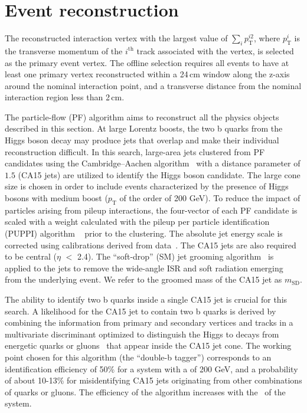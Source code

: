


\section{Event reconstruction}

The reconstructed interaction vertex with the largest value of $\sum_{i} p_\mathrm{T}^{i2}$, where $p_\mathrm{T}^{i}$ is the transverse momentum of the $i^\mathrm{th}$ track 
associated with the vertex, is selected as the primary event vertex. The offline selection requires all events to have at least one primary vertex reconstructed within a 24\,cm window along the z-axis around the nominal interaction point, and a transverse distance from the nominal interaction region less than 2\,cm.

The particle-flow (PF) \cite{Sirunyan:2017ulk} algorithm aims to reconstruct all the physics objects described in this section. At large Lorentz boosts, the two b quarks from the Higgs boson decay may produce jets that overlap and make their individual reconstruction difficult. In this search, large-area jets clustered from PF candidates using the Cambridge--Aachen algorithm~\cite{cajets} with a distance parameter of $1.5$ (CA15 jets) are utilized to identify the Higgs boson candidate.  The large cone size is chosen in order to include events characterized by the presence of Higgs bosons with medium boost ($p_\mathrm{T}$ of the order of 200 GeV).
To reduce the impact of particles arising from pileup interactions,  the four-vector of each PF candidate is scaled with a weight calculated with the pileup per particle identification (PUPPI) algorithm ~\cite{puppi} prior to the clustering.
The absolute jet energy scale is corrected using calibrations derived from data~\cite{jec}. The CA15 jets are also required to be central ($\eta$ $<$ 2.4).
The ``soft-drop'' (SM) jet grooming algorithm~\cite{msd} is applied to the jets to remove the wide-angle ISR and soft radiation emerging from the underlying event. We refer to the groomed mass of the CA15 jet as $m_\text{SD}$. 

The ability to identify two b quarks inside a single CA15 jet is
crucial for this search. A likelihood for the CA15 jet to contain two
b quarks is derived by combining the information from primary and secondary vertices and tracks in a multivariate discriminant optimized to distinguish the Higgs to \bb decays from energetic quarks or gluons~\cite{doubleb} that appear inside the CA15 jet cone.
The working point chosen for this algorithm (the ``double-b tagger'')
corresponds to an identification efficiency of 50\% for a \bb system
with a \pt of 200 GeV, and a probability of about 10-13\% for
misidentifying CA15 jets originating from other combinations of quarks
or gluons. The efficiency of the algorithm increases with the \pt~of the \bb system.

